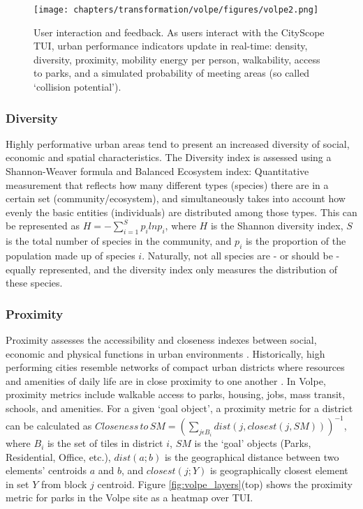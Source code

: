 {{        \begin{figure}[!htb]
            \begin{center}
                \texttt{[image: chapters/transformation/volpe/figures/volpe2.png]}
            \end{center}
            \caption{User interaction and feedback. As users interact with the CityScope TUI, urban performance indicators update in real-time: density, diversity, proximity, mobility energy per person, walkability, access to parks, and a simulated probability of meeting areas (so called `collision potential').}
            \label{fig:volpe_layers}
        \end{figure}

        \subsubsection{Diversity}
        {
            Highly performative urban areas tend to present an increased diversity of social, economic and spatial characteristics. The Diversity index is assessed using a Shannon-Weaver formula \cite{kemeny2013immigrant} and Balanced Ecosystem index: Quantitative measurement that reflects how many different types (species) there are in a certain set (community/ecosystem), and simultaneously takes into account how evenly the basic entities (individuals) are distributed among those types. This can be represented as $H = - \displaystyle\sum_{i=1}^{S} p_i ln p_i$, where $H$ is the Shannon diversity index, $S$ is the total number of species in the community, and $p_i$ is the proportion of the population made up of species $i$. Naturally, not all species are - or should be - equally represented, and the diversity index only measures the distribution of these species.
        }

        \subsubsection{Proximity}

        {
            Proximity assesses the accessibility and closeness indexes between social, economic and physical functions in urban environments \cite{sevtsuk2016pedestrian}. Historically, high performing cities resemble networks of compact urban districts where resources and amenities of daily life are in close proximity to one another \cite{westerink2013dealing}. In Volpe, proximity metrics include walkable access to parks, housing, jobs, mass transit, schools, and amenities. For a given `goal object', a proximity metric for a district can be calculated as $Closeness\,to\,SM = (\sum\limits_{j\epsilon B_i} dist(j,closest(j,SM)))^{-1}$, where $B_i$ is the set of tiles in district $i$, $SM$ is the `goal' objects (Parks, Residential, Office, etc.), $dist (a; b)$ is the geographical distance between two elements' centroids $a$ and $b$, and $closest (j;Y)$ is geographically closest element in set $Y$ from block $j$ centroid. Figure \eqref{fig:volpe_layers}(top) shows the proximity metric for parks in the Volpe site as a heatmap over TUI.
        }

}}
